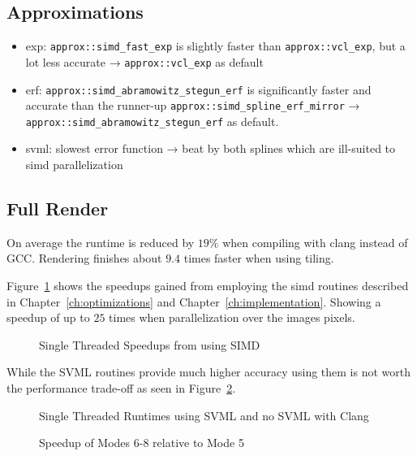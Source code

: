 \documentclass[a4paper, 11pt]{memoir}
\begin{document}
    \subsection{Approximations}
    \begin{itemize}
        \item exp: \texttt{approx::simd_fast_exp} is slightly faster than \texttt{approx::vcl_exp},
            but a lot less accurate →  \texttt{approx::vcl_exp} as default
        \item erf: \texttt{approx::simd_abramowitz_stegun_erf} is significantly faster and accurate than the
            runner-up \texttt{approx::simd_spline_erf_mirror} →  \texttt{approx::simd_abramowitz_stegun_erf}
            as default.
        \item svml: slowest error function →  beat by both splines which are ill-suited to simd parallelization
    \end{itemize}

    \subsection{Full Render}
    On average the runtime is reduced by $19\%$ when compiling with clang instead of GCC.
    Rendering finishes about $9.4$ times faster when using tiling.

    Figure~\ref{fig:runtimes_st_simd_speedup} shows
    the speedups gained from employing the \gls{simd} routines described in Chapter~\ref{ch:optimizations}
    and Chapter~\ref{ch:implementation}. Showing a speedup of up to $25$ times when
    parallelization over the images pixels.
    \begin{figure}[t]
        \centering
        
        \caption{Single Threaded Speedups from using SIMD}
        \label{fig:runtimes_st_simd_speedup}
    \end{figure}

    While the SVML routines provide much higher accuracy using them is not worth the
    performance trade-off as seen in Figure~\ref{fig:runtimes_st_svml_v_no}.
    \begin{figure}[t]
        \centering
        
        \caption{Single Threaded Runtimes using SVML and no SVML with Clang}
        \label{fig:runtimes_st_svml_v_no}
    \end{figure}

    \begin{figure}[t]
        \centering
        
        \caption{Speedup of Modes 6-8 relative to Mode 5}
        \label{fig:runtimes_st_v_mt}
    \end{figure}
\end{document}

